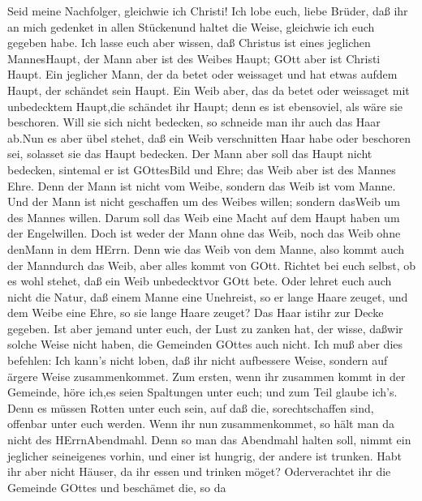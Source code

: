  Seid meine Nachfolger, gleichwie ich Christi! 
Ich lobe euch, liebe Brüder, daß ihr an mich gedenket in allen
Stückenund haltet die Weise, gleichwie ich euch gegeben habe.
 Ich lasse euch aber wissen, daß Christus ist eines
jeglichen MannesHaupt, der Mann aber ist des Weibes Haupt; GOtt aber ist
Christi Haupt.  Ein jeglicher Mann, der da betet oder
weissaget und hat etwas aufdem Haupt, der schändet sein Haupt.
 Ein Weib aber, das da betet oder weissaget mit unbedecktem
Haupt,die schändet ihr Haupt; denn es ist ebensoviel, als wäre sie
beschoren.  Will sie sich nicht bedecken, so schneide man
ihr auch das Haar ab.Nun es aber übel stehet, daß ein Weib verschnitten
Haar habe oder beschoren sei, solasset sie das Haupt bedecken.
 Der Mann aber soll das Haupt nicht bedecken, sintemal er
ist GOttesBild und Ehre; das Weib aber ist des Mannes Ehre. 
Denn der Mann ist nicht vom Weibe, sondern das Weib ist vom Manne.
 Und der Mann ist nicht geschaffen um des Weibes willen;
sondern dasWeib um des Mannes willen.  Darum soll das Weib
eine Macht auf dem Haupt haben um der Engelwillen.  Doch
ist weder der Mann ohne das Weib, noch das Weib ohne denMann in dem
HErrn.  Denn wie das Weib von dem Manne, also kommt auch
der Manndurch das Weib, aber alles kommt von GOtt.  Richtet
bei euch selbst, ob es wohl stehet, daß ein Weib unbedecktvor GOtt bete.
 Oder lehret euch auch nicht die Natur, daß einem Manne
eine Unehreist, so er lange Haare zeuget,  und dem Weibe
eine Ehre, so sie lange Haare zeuget? Das Haar istihr zur Decke gegeben.
 Ist aber jemand unter euch, der Lust zu zanken hat, der
wisse, daßwir solche Weise nicht haben, die Gemeinden GOttes auch nicht.
 Ich muß aber dies befehlen: Ich kann's nicht loben, daß
ihr nicht aufbessere Weise, sondern auf ärgere Weise zusammenkommet.
 Zum ersten, wenn ihr zusammen kommt in der Gemeinde, höre
ich,es seien Spaltungen unter euch; und zum Teil glaube ich's.
 Denn es müssen Rotten unter euch sein, auf daß die,
sorechtschaffen sind, offenbar unter euch werden.  Wenn ihr
nun zusammenkommet, so hält man da nicht des HErrnAbendmahl.
 Denn so man das Abendmahl halten soll, nimmt ein jeglicher
seineigenes vorhin, und einer ist hungrig, der andere ist trunken.
 Habt ihr aber nicht Häuser, da ihr essen und trinken
möget? Oderverachtet ihr die Gemeinde GOttes und beschämet die, so da
